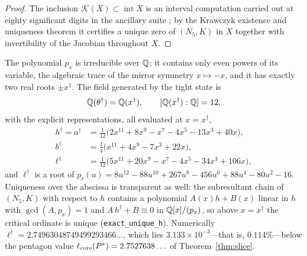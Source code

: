 \begin{proof}
The inclusion $\mathcal K(X)\subset\operatorname{int}X$ is an interval computation carried out at eighty significant digits in the ancillary suite \cite{anc}; by the Krawczyk existence and uniqueness theorem \cite{neumaier1990} it certifies a unique zero of $(N_5,K)$ in $X$ together with invertibility of the Jacobian throughout $X$.
\end{proof}

\begin{theorem}\label{thm:field}
The polynomial $p_x$ is irreducible over $\mathbb{Q}$; it contains only even powers of its variable, the algebraic trace of the mirror symmetry $x\mapsto-x$, and it has exactly two real roots $\pm x^\dagger$. The field generated by the tight state is
\begin{equation}\label{eq:field}
  \mathbb{Q}(\theta^\dagger)=\mathbb{Q}(x^\dagger),\qquad[\mathbb{Q}(x^\dagger):\mathbb{Q}]=12,
\end{equation}
with the explicit representations, all evaluated at $x=x^\dagger$,
\begin{align}
  h^\dagger=a^\dagger&=\tfrac1{12}\bigl(2x^{11}+8x^{9}-x^{7}-4x^{5}-13x^{3}+40x\bigr),\label{eq:hdagger}\\
  b^\dagger&=\tfrac14\bigl(x^{11}+4x^{9}-7x^{3}+22x\bigr),\label{eq:bdagger}\\
  \ell^\dagger&=\tfrac1{12}\bigl(5x^{11}+20x^{9}-x^{7}-4x^{5}-34x^{3}+106x\bigr),\label{eq:elldagger}
\end{align}
and $\ell^\dagger$ is a root of $p_\ell(u)=8u^{12}-88u^{10}+267u^{8}-456u^{6}+88u^{4}-80u^{2}-16$. Uniqueness over the abscissa is transparent as well: the subresultant chain of $(N_5,K)$ with respect to $h$ contains a polynomial $A(x)h+B(x)$ linear in $h$ with $\gcd(A,p_x)=1$ and $A\,h^\dagger+B\equiv0$ in $\mathbb{Q}[x]/(p_x)$, so above $x=x^\dagger$ the critical ordinate is unique (\texttt{exact\_unique\_h}). Numerically $\ell^\dagger=2.74963048749499293466\ldots$, which lies $3.133\times10^{-3}$---that is, $0.114\%$---below the pentagon value $\ell_{\mathrm{core}}(P^*)=2.7527638\ldots$ of Theorem~\textup{\ref{thm:slice}}.
\end{theorem}

